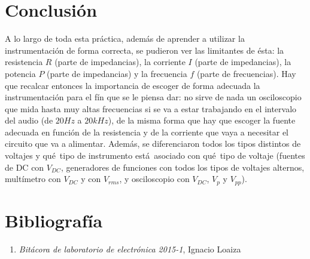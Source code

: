 \documentclass{article}
\begin{document}
\section{Conclusi\'on}
A lo largo de toda esta pr\'actica, adem\'as de aprender a utilizar la instrumentaci\'on de forma correcta, se pudieron ver las limitantes de \'esta: la resistencia $R$ (parte de impedancias), la corriente $I$ (parte de impedancias), la potencia $P$ (parte de impedancias) y la frecuencia $f$ (parte de frecuencias). Hay que recalcar entonces la importancia de escoger de forma adecuada la instrumentaci\'on para el f\'in que se le piensa dar: no sirve de nada un osciloscopio que mida hasta muy altas frecuencias si se va a estar trabajando en el intervalo del audio (de $20Hz$ a $20kHz$), de la misma forma que hay que escoger la fuente adecuada en funci\'on de la resistencia y de la corriente que vaya a necesitar el circuito que va a alimentar. Adem\'as, se diferenciaron todos los tipos distintos de voltajes y qu\'e\ tipo de instrumento est\'a\ asociado con qu\'e\ tipo de voltaje (fuentes de DC con $V_{DC}$, generadores de funciones con todos los tipos de voltajes alternos, mult\'imetro con $V_{DC}$ y con $V_{rms}$, y osciloscopio con $V_{DC}$, $V_p$ y $V_{pp}$).


\section{Bibliograf\'ia}
\begin{enumerate}
\item \textit{Bit\'acora de laboratorio de electr\'onica 2015-1}, Ignacio Loaiza
\end{enumerate}
\end{document}
